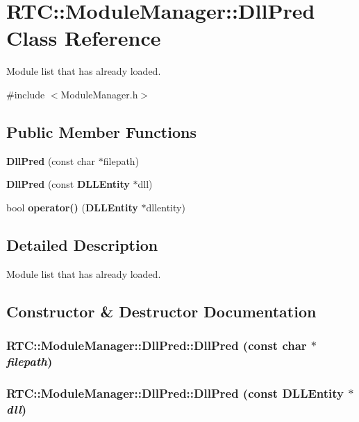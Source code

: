 \section{RTC::ModuleManager::DllPred Class Reference}
\label{classRTC_1_1ModuleManager_1_1DllPred}


Module list that has already loaded.  




{\ttfamily \#include $<$ModuleManager.h$>$}

\subsection*{Public Member Functions}
\begin{DoxyCompactItemize}
\item 
{\bf DllPred} (const char $\ast$filepath)
\item 
{\bf DllPred} (const {\bf DLLEntity} $\ast$dll)
\item 
bool {\bf operator()} ({\bf DLLEntity} $\ast$dllentity)
\end{DoxyCompactItemize}


\subsection{Detailed Description}
Module list that has already loaded. 

\subsection{Constructor \& Destructor Documentation}
\subsubsection[{DllPred}]{\setlength{\rightskip}{0pt plus 5cm}RTC::ModuleManager::DllPred::DllPred (const char $\ast$ {\em filepath})\hspace{0.3cm}{\ttfamily  [inline]}}\label{classRTC_1_1ModuleManager_1_1DllPred_a310047395705ffd885d7248607dadeba}
\subsubsection[{DllPred}]{\setlength{\rightskip}{0pt plus 5cm}RTC::ModuleManager::DllPred::DllPred (const {\bf DLLEntity} $\ast$ {\em dll})\hspace{0.3cm}{\ttfamily  [inline]}}\label{classRTC_1_1ModuleManager_1_1DllPred_a33b22d69fa04dbeafe0b8b8e207b59aa}


